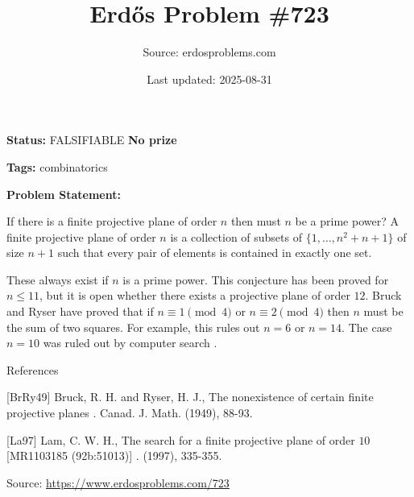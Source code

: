 \documentclass{article}
\title{Erd\H{o}s Problem \#723}
\date{Last updated: 2025-08-31}
\author{Source: erdosproblems.com}
\begin{document}
\maketitle

\noindent\textbf{Status:} FALSIFIABLE \quad \textbf{No prize}

\noindent\textbf{Tags:} combinatorics

\medskip

\noindent\textbf{Problem Statement:}

If there is a finite projective plane of order $n$ then must $n$ be a prime power? A finite projective plane of order $n$ is a collection of subsets of $\{1,\ldots,n^2+n+1\}$ of size $n+1$ such that every pair of elements is contained in exactly one set.




These always exist if $n$ is a prime power. This conjecture has been proved for $n\leq 11$, but it is open whether there exists a projective plane of order $12$. Bruck and Ryser \cite{BrRy49} have proved that if $n\equiv 1\pmod{4}$ or $n\equiv 2\pmod{4}$ then $n$ must be the sum of two squares. For example, this rules out $n=6$ or $n=14$. The case $n=10$ was ruled out by computer search \cite{La97}.




References

[BrRy49] Bruck, R. H. and Ryser, H. J., The nonexistence of certain finite projective planes . Canad. J. Math. (1949), 88-93.

[La97] Lam, C. W. H., The search for a finite projective plane of order {$10$} [{MR}1103185 (92b:51013)] . (1997), 335-355.

\bigskip
\noindent\small{Source: \url{https://www.erdosproblems.com/723}}
\end{document}
